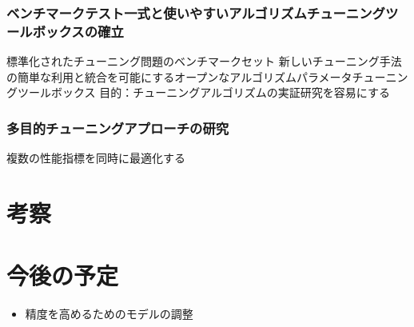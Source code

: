 \documentclass[twocolumn]{jarticle}     %
\begin{document}
\subsubsection{ベンチマークテスト一式と使いやすいアルゴリズムチューニングツールボックスの確立}
標準化されたチューニング問題のベンチマークセット
新しいチューニング手法の簡単な利用と統合を可能にするオープンなアルゴリズムパラメータチューニングツールボックス
目的：チューニングアルゴリズムの実証研究を容易にする

\subsubsection{多目的チューニングアプローチの研究}
複数の性能指標を同時に最適化する


\section{考察}

\section{今後の予定}
\begin{itemize}
	\item {精度を高めるためのモデルの調整}
\end{itemize}



\end{document}
